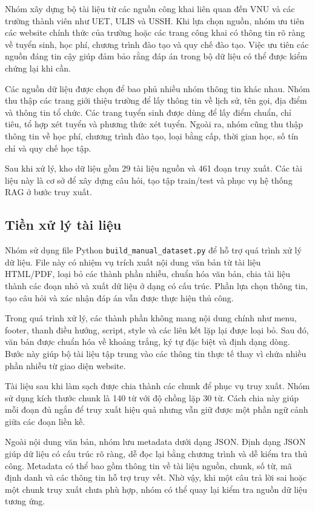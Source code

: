 \documentclass[12pt,a4paper]{report}
\begin{document}
Nhóm xây dựng bộ tài liệu từ các nguồn công khai liên quan đến VNU và các trường thành viên như UET, ULIS và USSH. Khi lựa chọn nguồn, nhóm ưu tiên các website chính thức của trường hoặc các trang công khai có thông tin rõ ràng về tuyển sinh, học phí, chương trình đào tạo và quy chế đào tạo. Việc ưu tiên các nguồn đáng tin cậy giúp đảm bảo rằng đáp án trong bộ dữ liệu có thể được kiểm chứng lại khi cần.

Các nguồn dữ liệu được chọn để bao phủ nhiều nhóm thông tin khác nhau. Nhóm thu thập các trang giới thiệu trường để lấy thông tin về lịch sử, tên gọi, địa điểm và thông tin tổ chức. Các trang tuyển sinh được dùng để lấy điểm chuẩn, chỉ tiêu, tổ hợp xét tuyển và phương thức xét tuyển. Ngoài ra, nhóm cũng thu thập thông tin về học phí, chương trình đào tạo, loại bằng cấp, thời gian học, số tín chỉ và quy chế học tập.

Sau khi xử lý, kho dữ liệu gồm 29 tài liệu nguồn và 461 đoạn truy xuất. Các tài liệu này là cơ sở để xây dựng câu hỏi, tạo tập train/test và phục vụ hệ thống RAG ở bước truy xuất.

\subsection{Tiền xử lý tài liệu}

Nhóm sử dụng file Python \texttt{build\_manual\_dataset.py} để hỗ trợ quá trình xử lý dữ liệu. File này có nhiệm vụ trích xuất nội dung văn bản từ tài liệu HTML/PDF, loại bỏ các thành phần nhiễu, chuẩn hóa văn bản, chia tài liệu thành các đoạn nhỏ và xuất dữ liệu ở dạng có cấu trúc. Phần lựa chọn thông tin, tạo câu hỏi và xác nhận đáp án vẫn được thực hiện thủ công.

Trong quá trình xử lý, các thành phần không mang nội dung chính như menu, footer, thanh điều hướng, script, style và các liên kết lặp lại được loại bỏ. Sau đó, văn bản được chuẩn hóa về khoảng trắng, ký tự đặc biệt và định dạng dòng. Bước này giúp bộ tài liệu tập trung vào các thông tin thực tế thay vì chứa nhiều phần nhiễu từ giao diện website.

Tài liệu sau khi làm sạch được chia thành các chunk để phục vụ truy xuất. Nhóm sử dụng kích thước chunk là 140 từ với độ chồng lặp 30 từ. Cách chia này giúp mỗi đoạn đủ ngắn để truy xuất hiệu quả nhưng vẫn giữ được một phần ngữ cảnh giữa các đoạn liền kề.

Ngoài nội dung văn bản, nhóm lưu metadata dưới dạng JSON. Định dạng JSON giúp dữ liệu có cấu trúc rõ ràng, dễ đọc lại bằng chương trình và dễ kiểm tra thủ công. Metadata có thể bao gồm thông tin về tài liệu nguồn, chunk, số từ, mã định danh và các thông tin hỗ trợ truy vết. Nhờ vậy, khi một câu trả lời sai hoặc một chunk truy xuất chưa phù hợp, nhóm có thể quay lại kiểm tra nguồn dữ liệu tương ứng.
\end{document}
